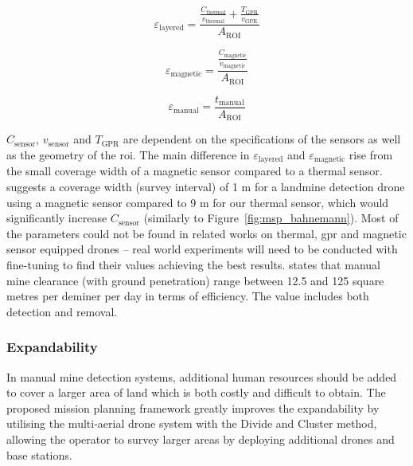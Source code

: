 \begin{equation}
\label{eq:msp_layeredefficiency}
\varepsilon_{\mathrm{layered}} = \frac{\frac{C_{\mathrm{thermal}}}{v_{\mathrm{thermal}}}+\frac{T_{\mathrm{GPR}}}{v_{\mathrm{GPR}}}}{A_{\mathrm{ROI}}}
\end{equation}

\begin{equation}
\label{eq:msp_magneticefficiency}
\varepsilon_{\mathrm{magnetic}} = \frac{\frac{C_{\mathrm{magnetic}}}{v_{\mathrm{magnetic}}}}{A_{\mathrm{ROI}}}
\end{equation}

\begin{equation}
\label{eq:msp_manualefficiency}
\varepsilon_{\mathrm{manual}} = \frac{t_{\mathrm{manual}}}{A_{\mathrm{ROI}}}
\end{equation}

$C_{\mathrm{sensor}}$, $v_{\mathrm{sensor}}$ and $T_{\mathrm{GPR}}$ are dependent on the specifications of the sensors as well as the geometry of the \gls{roi}. The main difference in $\varepsilon_{\mathrm{layered}}$ and $\varepsilon_{\mathrm{magnetic}}$ rise from the small coverage width of a magnetic sensor compared to a thermal sensor. \cite{yoo2024magnetic} suggests a coverage width (survey interval) of 1 m for a landmine detection drone using a magnetic sensor compared to 9 m for our thermal sensor, which would significantly increase $C_{\mathrm{sensor}}$ (similarly to Figure~\ref{fig:msp_bahnemann}). Most of the parameters could not be found in related works on thermal, \gls{gpr} and magnetic sensor equipped drones -- real world experiments will need to be conducted with fine-tuning to find their values achieving the best results. \cite{gichd2005manual} states that manual mine clearance (with ground penetration) range between 12.5 and 125 square metres per deminer per day in terms of efficiency. The value includes both detection and removal. 

\subsubsection{Expandability}

In manual mine detection systems, additional human resources should be added to cover a larger area of land which is both costly and difficult to obtain. The proposed mission planning framework greatly improves the expandability by utilising the multi-aerial drone system with the Divide and Cluster method, allowing the operator to survey larger areas by deploying additional drones and base stations. 


